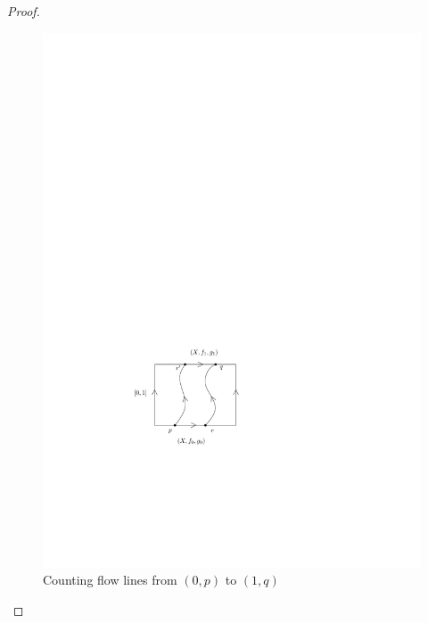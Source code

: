 \begin{proof}
\begin{figure}[tb]
\centering
\includegraphics[scale=1]{graphics/path-of-pairs-vector-field}
\caption{Counting flow lines from $(0,p)$ to $(1,q)$}
\label{path-of-pairs-vector-field}
\end{figure}
\end{proof}

